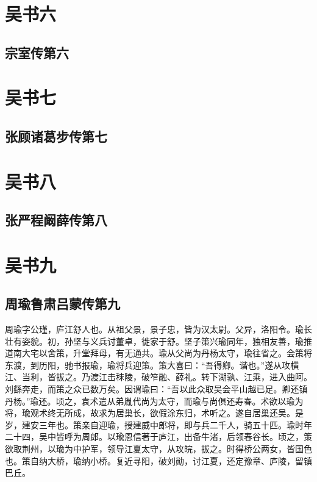 \documentclass[12pt,UTF8]{ctexbook}
\begin{document}
\part{吴书六}
\chapter{宗室传第六}

\part{吴书七}
\chapter{张顾诸葛步传第七}

\part{吴书八}
\chapter{张严程阚薛传第八}

\part{吴书九}

\chapter{周瑜鲁肃吕蒙传第九}


周瑜字公瑾，庐江舒人也。从祖父景，景子忠，皆为汉太尉。父异，洛阳令。瑜长壮有姿貌。初，孙坚与义兵讨董卓，徙家于舒。坚子策兴瑜同年，独相友善，瑜推道南大宅以舍策，升堂拜母，有无通共。瑜从父尚为丹杨太守，瑜往省之。会策将东渡，到历阳，驰书报瑜，瑜将兵迎策。策大喜曰：“吾得卿。谐也。”遂从攻横江、当利，皆拔之。乃渡江击秣陵，破笮融、薛礼。转下湖孰、江乘，进入曲阿。刘繇奔走，而策之众已数万矣。因谓瑜曰：“吾以此众取吴会平山越已足。卿还镇丹杨。”瑜还。顷之，袁术遣从弟胤代尚为太守，而瑜与尚俱还寿春。术欲以瑜为将，瑜观术终无所成，故求为居巢长，欲假涂东归，术听之。遂自居巢还吴。是岁，建安三年也。策亲自迎瑜，授建威中郎将，即与兵二千人，骑五十匹。瑜时年二十四，吴中皆呼为周郎。以瑜恩信著于庐江，出备牛渚，后领春谷长。顷之，策欲取荆州，以瑜为中护军，领导江夏太守，从攻皖，拔之。时得桥公两女，皆国色也。策自纳大桥，瑜纳小桥。复近寻阳，破刘勋，讨江夏，还定豫章、庐陵，留镇巴丘。
\end{document}
